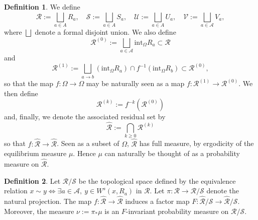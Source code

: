 \documentclass[a4paper]{article}
\theoremstyle{definition}
\newtheorem{definition}{Definition}[section]
\begin{document}
\begin{definition}

We define $$\mathcal{R} := \bigsqcup_{a \in A} R_a , \quad \mathcal{S} := \bigsqcup_{a \in A} S_a , \quad \mathcal{U} := \bigsqcup_{a \in A} U_a , \quad \mathcal{V} := \bigsqcup_{a \in \mathcal{A}} V_a ,$$
where $\bigsqcup$ denote a formal disjoint union. We also define $$ \mathcal{R}^{(0)} := \bigsqcup_{a \in \mathcal{A}} \text{int}_\Omega R_a \subset \mathcal{R} $$
and $$ \mathcal{R}^{(1)} := \bigsqcup_{a \rightarrow b} (\text{int}_{\Omega} R_a) \cap f^{-1}(\text{int}_{\Omega} R_b) \subset \mathcal{R}^{(0)}, $$
so that the map $f:\Omega \rightarrow \Omega$ may be naturally seen as a map $f : \mathcal{R}^{(1)} \longrightarrow \mathcal{R}^{(0)}$. We then define 
$$ \mathcal{R}^{(k)} := f^{-k}( \mathcal{R}^{(0)}) $$
and, finally, we denote the associated residual set by
$$ \widehat{\mathcal{R}} := \bigcap_{k \geq 0} \mathcal{R}^{(k)} $$
so that $f : \widehat{\mathcal{R}} \longrightarrow \widehat{\mathcal{R}}$. 
Seen as a subset of $\Omega$, $\widehat{\mathcal{R}}$ has full measure, by ergodicity of the equilibrium measure $\mu$. Hence $\mu$ can naturally be thought of as a probability measure on $\widehat{\mathcal{R}}$. 
\end{definition}


\begin{definition}
Let $\mathcal{R}/\mathcal{S}$ be the topological space defined by the equivalence relation $ x \sim y  \Leftrightarrow \exists a \in \mathcal{A}, \ y \in W^s(x,R_a) $ in $\mathcal{R}$. Let $\pi:\mathcal{R} \rightarrow \mathcal{R}/\mathcal{S}$ denote the natural projection. The map $f:\widehat{\mathcal{R}} \rightarrow \widehat{\mathcal{R}}$ induces a factor map $F : \widehat{\mathcal{R}}/\mathcal{S} \rightarrow \widehat{\mathcal{R}}/\mathcal{S}$. Moreover, the measure $\nu := \pi_* \mu$ is an $F$-invariant probability measure on $\mathcal{R}/\mathcal{S}$.
\end{definition}
\end{document}
